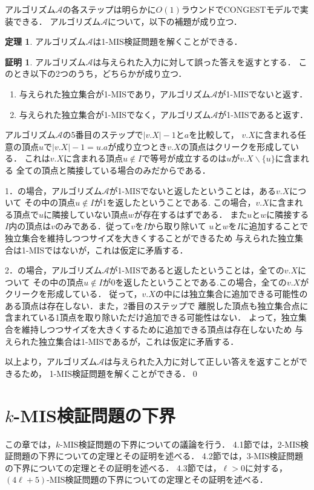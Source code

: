 \documentclass[12pt]{thesis}
\newcommand{\CONGEST}{\textsf{CONGEST}}
\theoremstyle{definition}
\newtheorem{theorem}{定理}[chapter]
\newtheorem*{prf*}{証明}
\begin{document}
アルゴリズム$\mathcal{A}$の各ステップは明らかに$O(1)$ラウンドで{\CONGEST}モデルで実装できる．
アルゴリズム$\mathcal{A}$について，以下の補題が成り立つ．
\begin{theorem}
アルゴリズム$\mathcal{A}$は1-MIS検証問題を解くことができる．
\end{theorem}
\begin{prf*}
アルゴリズム$\mathcal{A}$は与えられた入力に対して誤った答えを返すとする．
このとき以下の2つのうち，どちらかが成り立つ． 
\begin{enumerate}
\item 与えられた独立集合が1-MISであり，アルゴリズム$\mathcal{A}$が1-MISでないと返す． 
\item 与えられた独立集合が1-MISでなく，アルゴリズム$\mathcal{A}$が1-MISであると返す． 
\end{enumerate}
アルゴリズム$\mathcal{A}$の5番目のステップで$|v.X| - 1$と$a$を比較して，
$v.X$に含まれる任意の頂点$u$で$|v.X| - 1 = u.a$が成り立つとき$v.X$の頂点はクリークを形成している．
これは$v.X$に含まれる頂点$u \notin I$で等号が成立するのは$u$が$v.X \backslash \{u\}$に含まれる
全ての頂点と隣接している場合のみだからである．

1．の場合，アルゴリズム$\mathcal{A}$が1-MISでないと返したということは，ある$v.X$について
その中の頂点$u \notin I$が1を返したということである.
この場合，$v.X$に含まれる頂点で$u$に隣接していない頂点$w$が存在するはずである．
また$u$と$w$に隣接する$I$内の頂点は$v$のみである．従って$v$を$I$から取り除いて
$u$と$w$を$I$に追加することで独立集合を維持しつつサイズを大きくすることができるため
与えられた独立集合は1-MISではないが，これは仮定に矛盾する． 

2．の場合，アルゴリズム$\mathcal{A}$が1-MISであると返したということは，全ての$v.X$について
その中の頂点$u \notin I$が0を返したということである.この場合，全ての$v.X$がクリークを形成している．
従って，$v.X$の中には独立集合に追加できる可能性のある頂点は存在しない．また，2番目のステップで
離脱した頂点も独立集合点に含まれている1頂点を取り除いただけ追加できる可能性はない．
よって，独立集合を維持しつつサイズを大きくするために追加できる頂点は存在しないため
与えられた独立集合は1-MISであるが，これは仮定に矛盾する． 

以上より，アルゴリズム$\mathcal{A}$は与えられた入力に対して正しい答えを返すことができるため，
1-MIS検証問題を解くことができる．\qed
\end{prf*}
\newpage

\chapter{$k$-MIS検証問題の下界}
この章では，$k$-MIS検証問題の下界についての議論を行う．
4.1節では，2-MIS検証問題の下界についての定理とその証明を述べる．
4.2節では，3-MIS検証問題の下界についての定理とその証明を述べる．
4.3節では，$\ell > 0$に対する，$(4\ell + 5)$-MIS検証問題の下界についての定理とその証明を述べる．
\end{document}
